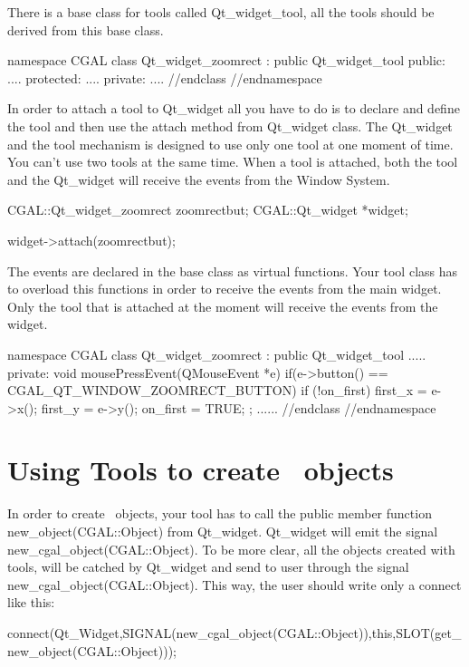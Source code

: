 There is a base class for tools called Qt\_widget\_tool, all the tools should 
be derived from this base class.
\begin{ccExampleCode}
namespace CGAL {
class Qt_widget_zoomrect : public Qt_widget_tool
{
public:
	....
protected:
	....
private:
	....
}//endclass
}//endnamespace
\end{ccExampleCode}
In order to attach a tool to Qt\_widget all you have to do is to declare and 
define the tool and then use the attach method from Qt\_widget class. The 
Qt\_widget and the tool mechanism is designed to use only one tool at one moment of time. You can't use two tools at the same time. When a tool is attached, both the tool and the Qt\_widget will receive the events from the Window System.
\begin{ccExampleCode}
CGAL::Qt_widget_zoomrect	zoomrectbut;
CGAL::Qt_widget			*widget;

widget->attach(zoomrectbut);
\end{ccExampleCode}
The events are declared in the base class as virtual functions. Your tool class
has to overload this functions in order to receive the events from the main 
widget. Only the tool that is attached at the moment will receive the events
from the widget.
\begin{ccExampleCode}
namespace CGAL {
class Qt_widget_zoomrect : public Qt_widget_tool
{
.....
private:
  void mousePressEvent(QMouseEvent *e)
  {
    if(e->button() == CGAL_QT_WINDOW_ZOOMRECT_BUTTON)
    {
      if (!on_first)
      {
        first_x = e->x();
        first_y = e->y();
        on_first = TRUE;
      }
    }
  };
......
}//endclass
}//endnamespace
\end{ccExampleCode}

\section{Using Tools to create \cgal\ objects}
\label{create_cgal_objects}

In order to create \cgal\ objects, your tool has to call the public member 
function new\_object(CGAL::Object) from Qt\_widget. Qt\_widget will emit the 
signal new\_cgal\_object(CGAL::Object). To be more clear, all the objects 
created with tools, will be catched by Qt\_widget and send to user through the
 signal new\_cgal\_object(CGAL::Object). This way, the user should write only 
a connect like this:

connect(Qt\_Widget,SIGNAL(new\_cgal\_object(CGAL::Object)),this,SLOT(get\_new\_object(CGAL::Object)));

